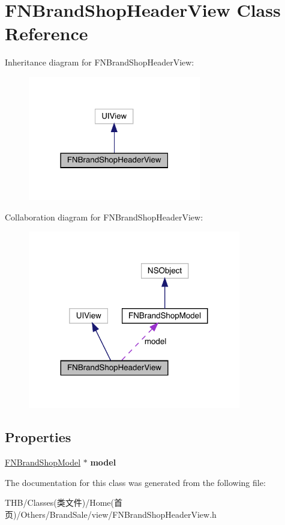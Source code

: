 \hypertarget{interface_f_n_brand_shop_header_view}{}\section{F\+N\+Brand\+Shop\+Header\+View Class Reference}
\label{interface_f_n_brand_shop_header_view}


Inheritance diagram for F\+N\+Brand\+Shop\+Header\+View\+:\nopagebreak
\begin{figure}[H]
\begin{center}
\leavevmode
\includegraphics[width=214pt]{interface_f_n_brand_shop_header_view__inherit__graph}
\end{center}
\end{figure}


Collaboration diagram for F\+N\+Brand\+Shop\+Header\+View\+:\nopagebreak
\begin{figure}[H]
\begin{center}
\leavevmode
\includegraphics[width=263pt]{interface_f_n_brand_shop_header_view__coll__graph}
\end{center}
\end{figure}
\subsection*{Properties}
\begin{DoxyCompactItemize}
\item 
\mbox{\label{interface_f_n_brand_shop_header_view_a3504c5dc35c144485fca7b3dc841a993}} 
\mbox{\hyperlink{interface_f_n_brand_shop_model}{F\+N\+Brand\+Shop\+Model}} $\ast$ {\bfseries model}
\end{DoxyCompactItemize}


The documentation for this class was generated from the following file\+:\begin{DoxyCompactItemize}
\item 
T\+H\+B/\+Classes(类文件)/\+Home(首页)/\+Others/\+Brand\+Sale/view/F\+N\+Brand\+Shop\+Header\+View.\+h\end{DoxyCompactItemize}
